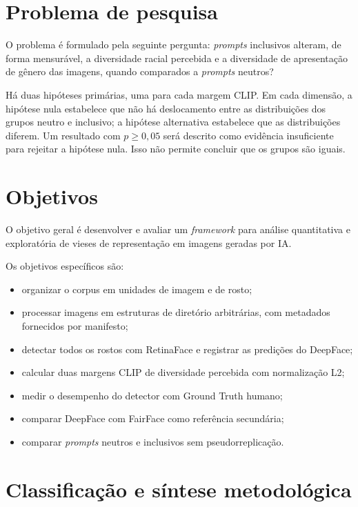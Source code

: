 \section{Problema de pesquisa}

O problema é formulado pela seguinte pergunta: \textit{prompts} inclusivos alteram, de forma mensurável, a diversidade racial percebida e a diversidade de apresentação de gênero das imagens, quando comparados a \textit{prompts} neutros?

Há duas hipóteses primárias, uma para cada margem CLIP. Em cada dimensão, a hipótese nula estabelece que não há deslocamento entre as distribuições dos grupos neutro e inclusivo; a hipótese alternativa estabelece que as distribuições diferem. Um resultado com $p \geq 0,05$ será descrito como evidência insuficiente para rejeitar a hipótese nula. Isso não permite concluir que os grupos são iguais.

\section{Objetivos}

O objetivo geral é desenvolver e avaliar um \textit{framework} para análise quantitativa e exploratória de vieses de representação em imagens geradas por IA.

Os objetivos específicos são:
\begin{itemize}
    \item organizar o corpus em unidades de imagem e de rosto;
    \item processar imagens em estruturas de diretório arbitrárias, com metadados fornecidos por manifesto;
    \item detectar todos os rostos com RetinaFace e registrar as predições do DeepFace;
    \item calcular duas margens CLIP de diversidade percebida com normalização L2;
    \item medir o desempenho do detector com Ground Truth humano;
    \item comparar DeepFace com FairFace como referência secundária;
    \item comparar \textit{prompts} neutros e inclusivos sem pseudorreplicação.
\end{itemize}

\section{Classificação e síntese metodológica}

